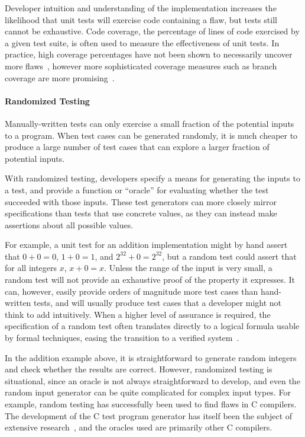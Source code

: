 Developer intuition and understanding of the implementation increases
the likelihood that unit tests will exercise code containing a flaw,
but tests still cannot be exhaustive. Code coverage, the percentage of
lines of code exercised by a given test suite, is often used to
measure the effectiveness of unit tests. In practice, high coverage
percentages have not been shown to necessarily uncover more
flaws~\cite{inozemtseva2014coverage}, however more sophisticated
coverage measures such as branch coverage are more
promising~\cite{gligoric2013comparing}.

\paragraph{Randomized Testing}

Manually-written tests can only exercise a small fraction of the
potential inputs to a program. When test cases can be generated
randomly, it is much cheaper to produce a large number of test cases
that can explore a larger fraction of potential inputs.

With randomized testing, developers specify a means for generating the
inputs to a test, and provide a function or ``oracle'' for evaluating
whether the test succeeded with those inputs. These test generators
can more closely mirror specifications than tests that use concrete
values, as they can instead make assertions about all possible
values.

For example, a unit test for an addition implementation might by hand
assert that $0+0=0$, $1+0=1$, and $2^{32}+0=2^{32}$, but a random test
could assert that for all integers $x$, $x+0=x$. Unless the range of
the input is very small, a random test will not provide an exhaustive
proof of the property it expresses. It can, however, easily provide
orders of magnitude more test cases than hand-written tests, and will
usually produce test cases that a developer might not think to add
intuitively. When a higher level of assurance is required, the
specification of a random test often translates directly to a logical
formula usable by formal techniques, easing the transition to a
verified system~\cite{swierstra2012xmonad}.

In the addition example above, it is straightforward to generate
random integers and check whether the results are correct. However,
randomized testing is situational, since an oracle is not always
straightforward to develop, and even the random input generator can be
quite complicated for complex input types. For example, random testing
has successfully been used to find flaws in C compilers. The
development of the C test program generator has itself been the
subject of extensive research~\cite{yang2011finding}, and the oracles
used are primarily other C compilers.

